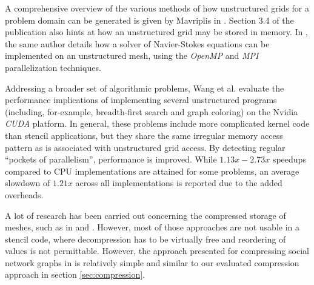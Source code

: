 A comprehensive overview of the various methods of how unstructured grids for a problem domain can be generated is given by Mavriplis in \cite{mavriplis1997}. Section 3.4 of the publication also hints at how an unstructured grid may be stored in memory. In \cite{mavriplis2002parallel}, the same author details how a solver of Navier-Stokes equations can be implemented on an unstructured mesh, using the \emph{OpenMP} and \emph{MPI} parallelization techniques.

Addressing a broader set of algorithmic problems, Wang et al. \cite{wang2014} evaluate the performance implications of implementing several unstructured programs (including, for-example, breadth-first search and graph coloring) on the Nvidia \emph{CUDA} platform. In general, these problems include more complicated kernel code than stencil applications, but they share the same irregular memory access pattern as is associated with unstructured grid access. By detecting regular ``pockets of parallelism'', performance is improved. While $1.13x - 2.73x$ speedups compared to CPU implementations are attained for some problems, an average slowdown of $1.21x$ across all implementations is reported due to the added overheads.

A lot of research has been carried out concerning the compressed storage of meshes, such as in \cite{edgebreaker} and \cite{edgebreaker-quadrilateral}. However, most of those approaches are not usable in a stencil code, where decompression has to be virtually free and reordering of values is not permittable. However, the approach presented for compressing social network graphs in \cite{social} is relatively simple and similar to our evaluated compression approach in section \ref{sec:compression}.